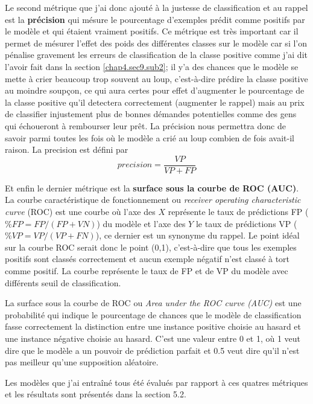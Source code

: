 Le second métrique que j'ai donc ajouté à la justesse de classification et au rappel est la \textbf{précision} qui mésure le pourcentage d'exemples prédit comme positifs par le modèle et qui étaient vraiment positifs. Ce métrique est très important car il permet de mésurer l'effet des poids des différentes classes sur le modèle car si l'on pénalise gravement les erreurs de classification de la classe positive comme j'ai dit l'avoir fait dans la section \ref{chap4.sec9.sub2}; il y'a des chances que le modèle se mette à crier beaucoup trop souvent au loup, c'est-à-dire prédire la classe positive au moindre soupçon, ce qui aura certes pour effet d'augmenter le pourcentage de la classe positive qu'il detectera correctement (augmenter le rappel) mais au prix de classifier injustement plus de bonnes démandes potentielles comme des gens qui échoueront à rembourser leur prêt. La précision nous permettra donc de savoir parmi toutes les fois où le modèle a crié au loup combien de fois avait-il raison. La precision est défini par \[precision = \frac{VP}{VP + FP}\]

Et enfin le dernier métrique est la \textbf{surface sous la courbe de ROC (AUC)}. La courbe caractéristique de fonctionnement ou \textit{receiver operating characteristic curve} (ROC) est une courbe où l'axe des \(X\) représente le taux de prédictions FP (\(\%FP = FP / (FP + VN)\)) du modèle et l'axe des \(Y\) le taux de prédictions VP  (\(\%VP = VP / (VP + FN)\)), ce dernier est un synonyme du rappel. Le point idéal sur la courbe ROC serait donc le point (0,1), c'est-à-dire que tous les exemples positifs sont classés correctement et aucun exemple négatif n'est classé à tort comme positif. La courbe représente le taux de FP et de VP du modèle avec différents seuil de classification. 

La surface sous la courbe de ROC ou \textit{Area under the ROC curve (AUC)} est une probabilité qui indique le pourcentage de chances que le modèle de classification fasse correctement la distinction entre une instance positive choisie au hasard et une instance négative choisie au hasard. C'est une valeur entre 0 et 1, où 1 veut dire que le modèle a un pouvoir de prédiction parfait et 0.5 veut dire qu'il n'est pas meilleur qu'une supposition aléatoire. 

Les modèles que j'ai entraîné tous été évalués par rapport à ces quatres métriques et les résultats sont présentés dans la section 5.2. 